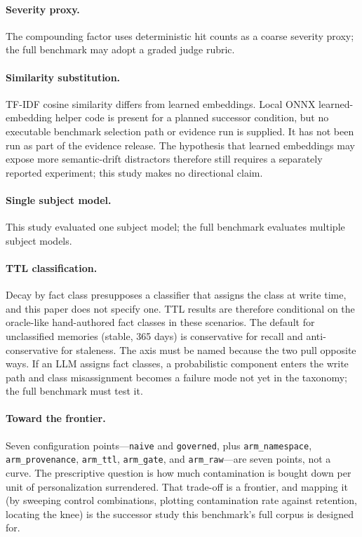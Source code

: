 \documentclass[11pt]{article}
\begin{document}
\paragraph{Severity proxy.} The compounding factor uses deterministic hit
counts as a coarse severity proxy; the full benchmark may adopt a graded
judge rubric.

\paragraph{Similarity substitution.} TF-IDF cosine similarity differs from
learned embeddings. Local ONNX learned-embedding helper code is present for a
planned successor condition, but no executable benchmark selection path or
evidence run is supplied. It has not been run as part of the evidence
release. The hypothesis that learned embeddings may expose more semantic-drift
distractors therefore still requires a separately reported experiment; this
study makes no directional claim.

\paragraph{Single subject model.} This study evaluated one subject model;
the full benchmark evaluates multiple subject models.

\paragraph{TTL classification.} Decay by fact class presupposes a
classifier that assigns the class at write time, and this paper does not
specify one. TTL results are therefore conditional on the oracle-like
hand-authored fact classes in these scenarios. The default for unclassified memories (stable, 365 days) is
conservative for recall and anti-conservative for staleness. The axis
must be named because the two pull opposite ways. If an LLM assigns fact
classes, a probabilistic component enters the write path and class
misassignment becomes a failure mode not yet in the taxonomy; the full
benchmark must test it.

\paragraph{Toward the frontier.} Seven configuration points---\texttt{naive}
and \texttt{governed}, plus \texttt{arm\_namespace},
\texttt{arm\_provenance}, \texttt{arm\_ttl}, \texttt{arm\_gate}, and
\texttt{arm\_raw}---are seven points, not a curve. The prescriptive question
is how much contamination is
bought down per unit of personalization surrendered. That trade-off is a
frontier, and mapping it (by sweeping control combinations, plotting
contamination rate against retention, locating the knee) is the successor
study this benchmark's full corpus is designed
for.
\end{document}
